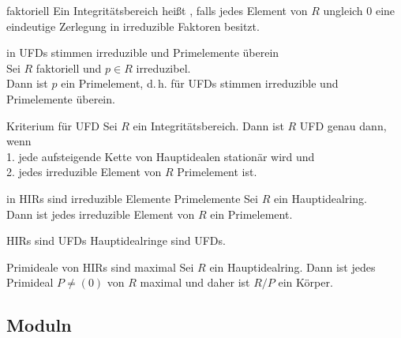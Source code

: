 \begin{Def}{faktoriell}
    Ein Integritätsbereich heißt , falls jedes Element von $R$ ungleich
    $0$ eine eindeutige Zerlegung in irreduzible Faktoren besitzt.
\end{Def}

\begin{Satz}{in UFDs stimmen irreduzible und Primelemente überein} \\
    Sei $R$ faktoriell und $p \in R$ irreduzibel. \\
    Dann ist $p$ ein Primelement, d.\,h. für UFDs stimmen irreduzible und
    Primelemente überein.
\end{Satz}

\begin{Satz}{Kriterium für UFD}
    Sei $R$ ein Integritätsbereich.
    Dann ist $R$ UFD genau dann, wenn \\
    1. jede aufsteigende Kette von Hauptidealen stationär wird und \\
    2. jedes irreduzible Element von $R$ Primelement ist.
\end{Satz}

\begin{Satz}{in HIRs sind irreduzible Elemente Primelemente}
    Sei $R$ ein Hauptidealring. \\
    Dann ist jedes irreduzible Element von $R$ ein Primelement.
\end{Satz}

\begin{Satz}{HIRs sind UFDs}
    Hauptidealringe sind UFDs.
\end{Satz}

\begin{Satz}{Primideale von HIRs sind maximal}
    Sei $R$ ein Hauptidealring.
    Dann ist jedes Primideal $P \not= (0)$ von $R$ maximal und daher ist
    $R/P$ ein Körper.
\end{Satz}

\pagebreak

\subsection{%
    Moduln%
}

